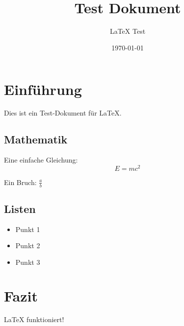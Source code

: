 \documentclass{article}
\title{Test Dokument}
\author{LaTeX Test}
\date{\today}
\begin{document}
\maketitle

\section{Einführung}

Dies ist ein Test-Dokument für LaTeX.

\subsection{Mathematik}

Eine einfache Gleichung:
\begin{equation}
E = mc^2
\end{equation}

Ein Bruch: $\frac{a}{b}$

\subsection{Listen}

\begin{itemize}
\item Punkt 1
\item Punkt 2
\item Punkt 3
\end{itemize}

\section{Fazit}

LaTeX funktioniert!
\end{document}
